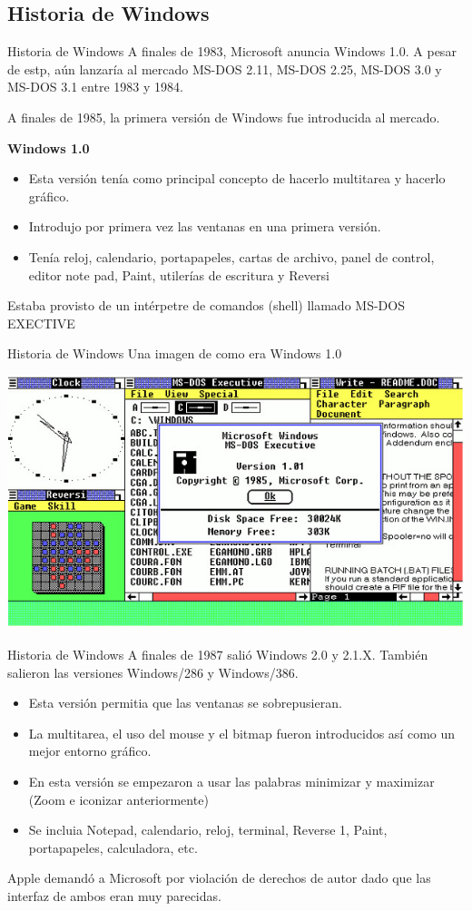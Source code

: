 \documentclass[11pt]{beamer}
\begin{document}
	\subsection{Historia de Windows}
		\begin{frame}{Historia de Windows}
			A finales de 1983, Microsoft anuncia Windows 1.0. A pesar de estp, aún lanzaría al mercado MS-DOS 2.11, MS-DOS 2.25, MS-DOS 3.0 y MS-DOS 3.1 entre 1983 y 1984.
			
			A finales de 1985, la primera versión de Windows fue introducida al mercado.
			
			\textbf{Windows 1.0}
			\begin{itemize}
				\item Esta versión tenía como principal concepto de hacerlo multitarea y hacerlo gráfico.
				\item Introdujo por primera vez las ventanas en una primera versión.
				\item Tenía reloj, calendario, portapapeles, cartas de archivo, panel de control, editor note pad, Paint, utilerías de escritura y Reversi
			\end{itemize}
			Estaba provisto de un intérpetre de comandos (shell) llamado MS-DOS EXECTIVE
		\end{frame}
		\begin{frame}{Historia de Windows}
			Una imagen de como era Windows 1.0
			
			\includegraphics[scale=0.7]{w1.jpg}
		\end{frame}
		\begin{frame}{Historia de Windows}
			A finales de 1987 salió Windows 2.0 y 2.1.X. También salieron las versiones Windows/286 y Windows/386.
			
			\begin{itemize}
				\item Esta versión permitia que las ventanas se sobrepusieran.
				\item La multitarea, el uso del mouse y el bitmap fueron introducidos así como un mejor entorno gráfico.
				\item En esta versión se empezaron a usar las palabras minimizar y maximizar (Zoom e iconizar anteriormente)
				\item Se incluia Notepad, calendario, reloj, terminal, Reverse 1, Paint, portapapeles, calculadora, etc.
			\end{itemize}
			Apple demandó a Microsoft por violación de derechos de autor dado que las interfaz de ambos eran muy parecidas.
		\end{frame}
\end{document}
